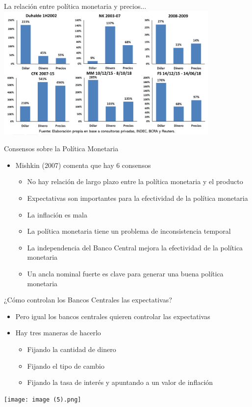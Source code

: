 \documentclass{beamer}
\begin{document}
\begin{frame}{ La relación entre política monetaria y precios...}
\centering\includegraphics[width=11cm]{Figures/P57.png}\
\end{frame}

\begin{frame}{Consensos sobre la Política Monetaria}
\begin{itemize}
    \item Mishkin (2007) comenta que hay 6 consensos 
    \begin{itemize}
        \item No hay relación de largo plazo entre la política monetaria y el producto
        \item Expectativas son importantes para la efectividad de la política monetaria
        \item La inflación es mala
        \item La política monetaria tiene un problema de inconsistencia temporal
        \item La independencia del Banco Central mejora la efectividad de la política monetaria
        \item Un ancla nominal fuerte es clave para generar una buena política monetaria
    \end{itemize}
\end{itemize}
\end{frame}

\begin{frame}{¿Cómo controlan los Bancos Centrales las expectativas?}
    \begin{itemize}
 \item Pero igual los bancos centrales quieren controlar las expectativas
 \item Hay tres maneras de hacerlo
  \begin{itemize}
    \item Fijando la cantidad de dinero
    \item Fijando el tipo de cambio
    \item Fijando la tasa de interés y apuntando a un valor de inflación
   \end{itemize}
  \end{itemize}
 
  \centering\texttt{[image: image (5).png]}\
  
\end{frame}
\end{document}
